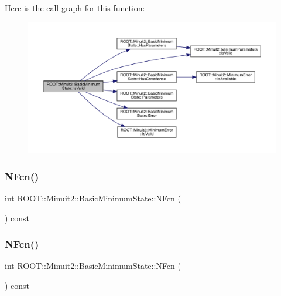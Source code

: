Here is the call graph for this function\+:
\nopagebreak
\begin{figure}[H]
\begin{center}
\leavevmode
\includegraphics[width=350pt]{d0/db1/classROOT_1_1Minuit2_1_1BasicMinimumState_af92e32efe08fa047bc433db6f058d11a_cgraph}
\end{center}
\end{figure}
\mbox{\label{classROOT_1_1Minuit2_1_1BasicMinimumState_ac4566e929ac5ec9fe2dba914bb21207b}} 
\subsubsection{\texorpdfstring{NFcn()}{NFcn()}\hspace{0.1cm}{\footnotesize\ttfamily [1/3]}}
{\footnotesize\ttfamily int R\+O\+O\+T\+::\+Minuit2\+::\+Basic\+Minimum\+State\+::\+N\+Fcn (\begin{DoxyParamCaption}{ }\end{DoxyParamCaption}) const\hspace{0.3cm}{\ttfamily [inline]}}

\mbox{\label{classROOT_1_1Minuit2_1_1BasicMinimumState_ac4566e929ac5ec9fe2dba914bb21207b}} 
\subsubsection{\texorpdfstring{NFcn()}{NFcn()}\hspace{0.1cm}{\footnotesize\ttfamily [2/3]}}
{\footnotesize\ttfamily int R\+O\+O\+T\+::\+Minuit2\+::\+Basic\+Minimum\+State\+::\+N\+Fcn (\begin{DoxyParamCaption}{ }\end{DoxyParamCaption}) const\hspace{0.3cm}{\ttfamily [inline]}}

